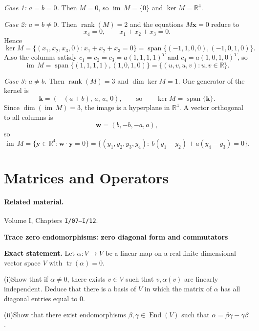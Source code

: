 \begin{solution}
\emph{Case 1: $a=b=0$.} Then $M=0$, so $\operatorname{im}\,M=\{0\}$ and $\ker M=\mathbb R^4$.

\emph{Case 2: $a=b\neq 0$.} Then $\operatorname{rank}(M)=2$ and the equations $M\mathbf x=0$ reduce to
\[
x_4=0,\qquad x_1+x_2+x_3=0.
\]
Hence
\[
\ker M=\{(x_1,x_2,x_3,0):x_1+x_2+x_3=0\}
=\operatorname{span}\{(-1,1,0,0),(-1,0,1,0)\}.
\]
Also the columns satisfy $c_1=c_2=c_3=a(1,1,1,1)^T$ and $c_4=a(1,0,1,0)^T$, so
\[
\operatorname{im}\,M=\operatorname{span}\{(1,1,1,1),(1,0,1,0)\}
=\{(u,v,u,v):u,v\in\mathbb R\}.
\]

\emph{Case 3: $a\neq b$.} Then $\operatorname{rank}(M)=3$ and $\dim\ker M=1$. One generator of the kernel is
\[
\mathbf k=(-(a+b),\,a,\,a,\,0),
\qquad\text{so}\qquad
\ker M=\operatorname{span}\{\mathbf k\}.
\]
Since $\dim(\operatorname{im}\,M)=3$, the image is a hyperplane in $\mathbb R^4$. A vector orthogonal to all columns is
\[
\mathbf w=(b,-b,-a,a),
\]
so
\[
\operatorname{im}\,M=\{\mathbf y\in\mathbb R^4:\mathbf w\cdot\mathbf y=0\}
=\{(y_1,y_2,y_3,y_4):\ b(y_1-y_2)+a(y_4-y_3)=0\}.
\]
\end{solution}

\section{Matrices and Operators}

\paragraph{Related material.} Volume I, Chapters \texttt{I/07--I/12}.

\begin{problem}[CP-I-0003]
\label{prob:cp-i-0003}
\textbf{Trace zero endomorphisms: zero diagonal form and commutators}

\textbf{Exact statement.}
\hspace*{1.5em}Let \(\alpha:V\to V\) be a linear map on a real finite-dimensional vector space \(V\) with \(\operatorname{tr}(\alpha)=0\).

	\par\noindent (i)\quad Show that if \(\alpha\neq 0\), there exists \(v\in V\) such that \(v,\alpha(v)\) are linearly independent.
	Deduce that there is a basis of \(V\) in which the matrix of \(\alpha\) has all diagonal entries equal to \(0\).
	\par\noindent (ii)\quad Show that there exist endomorphisms \(\beta,\gamma\in\operatorname{End}(V)\) such that \(\alpha=\beta\gamma-\gamma\beta\).

\end{problem}


